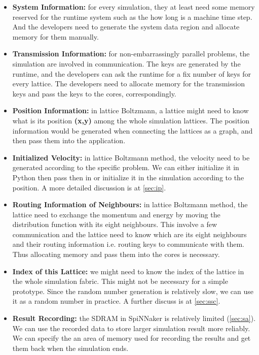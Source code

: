 \begin{itemize}
    \item \textbf{System Information:} for every simulation, they at least need some memory reserved for the runtime system such as the how long is a machine time step. And the developers need to generate the system data region and allocate memory for them manually.
    
    \item \textbf{Transmission Information:} for non-embarrassingly parallel problems, the simulation are involved in communication. The keys are generated by the runtime, and the developers can ask the runtime for a fix number of keys for every lattice. The developers need to allocate memory for the transmission keys and pass the keys to the cores, correspondingly.

    \item \textbf{Position Information:} in lattice Boltzmann, a lattice might need to know what is its position \textbf{(x,y)} among the whole simulation lattices. The position information would be generated when connecting the lattices as a graph, and then pass them into the application.
    
    \item \textbf{Initialized Velocity:} in lattice Boltzmann method, the velocity need to be generated according to the specific problem. We can either initialize it in Python then pass then in or initialize it in the simulation according to the position. A more detailed discussion is at \ref{sec:ip}.
    
    \item \textbf{Routing Information of Neighbours:} in lattice Boltzmann method, the lattice need to exchange the momentum and energy by moving the distribution function with its eight neighbours. This involve a few communication and the lattice need to know which are its eight neighbours and their routing information i.e. routing keys to communicate with them. Thus allocating memory and pass them into the cores is necessary. 
    
    \item \textbf{Index of this Lattice:} we might need to know the index of the lattice in the whole simulation fabric. This might not be necessary for a simple prototype. Since the random number generation is relatively slow, we can use it as a random number in practice. A further discuss is at \ref{sec:ssc}.
    
    \item \textbf{Result Recording:} the SDRAM in SpiNNaker is relatively limited (\ref{sec:sa}). We can use the recorded data to store larger simulation result more reliably. We can specify the an area of memory used for recording the results and get them back when the simulation ends.
\end{itemize}

